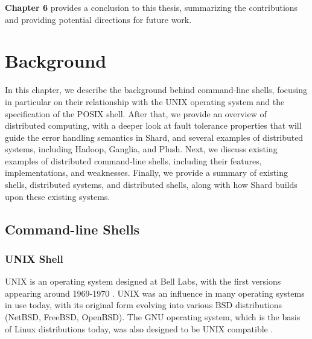 \documentclass[twoside]{report}
\begin{document}
\textbf{Chapter 6} provides a conclusion to this thesis, summarizing the contributions and providing potential directions for future work.


\chapter{Background}

In this chapter, we describe the background behind command-line shells, focusing in particular on their relationship with the UNIX operating system and the specification of the POSIX shell.
After that, we provide an overview of distributed computing, with a deeper look at fault tolerance properties that will guide the error handling semantics in Shard, and several examples of distributed systems, including Hadoop, Ganglia, and Plush.
Next, we discuss existing examples of distributed command-line shells, including their features, implementations, and weaknesses.
Finally, we provide a summary of existing shells, distributed systems, and distributed shells, along with how Shard builds upon these existing systems.

\section{Command-line Shells}
\subsection{UNIX Shell}
UNIX is an operating system designed at Bell Labs, with the first versions appearing around 1969-1970 \cite{10.1145/361011.361061}.
UNIX was an influence in many operating systems in use today, with its original form evolving into various BSD distributions (NetBSD, FreeBSD, OpenBSD). The GNU operating system, which is the basis of Linux distributions today, was also designed to be UNIX compatible \cite{bretthauer2001open}.
\end{document}
